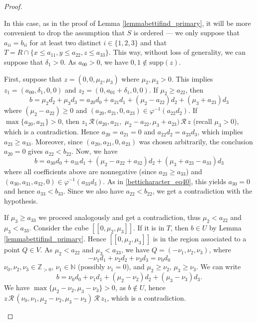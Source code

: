 \documentclass[12pt]{article}
\theoremstyle{remark}
\begin{document}
\begin{proof}
\begin{itemize}
    In this case, as in the proof of Lemma \ref{lemmabettifind_primary}, it will be more convenient to drop the assumption that $S$ is ordered --- we only suppose that $a_{ii}=b_{ii}$ for at least two distinct $i \in \{1,2,3\}$ and that  $T = R \cap \{x \leq a_{11},y\leq a_{22}, z \leq a_{33}\}$. This way, without loss of generality, we can suppose that $\delta_1 > 0$. As $a_{00} >0$, we have $0,1 \notin \text{supp}(z)$. 

    First, suppose that $z = (0,0,\mu_2,\mu_3)$ where $\mu_2,\mu_3>0$. This implies $z_1 = (a_{00},\delta_1,0,0 )$ and $z_2 =(0,a_{01}+\delta_1,0,0)$. 
    If $\mu_2 \geq a_{22}$, then
   \begin{equation}\label{betticharacter_eq40}
         b =\mu_2d_2 + \mu_3d_3 = a_{20}d_0 + a_{21}d_1 +(\mu_2-a_{22})d_2 + (\mu_3+a_{23})d_3
   \end{equation}
   where $(\mu_2-a_{22}) \geq 0$ and $(a_{20},a_{21},0,a_{23}) \in \varphi^{-1}(a_{22}d_2)$.
   If $\max \{a_{20},a_{21} \}>0$, then $z_1 \, \mathcal{R} \,(a_{20},a_{21},$ $ \mu_2-a_{22},\mu_3+a_{23}) \, \mathcal{R} \, z$ (recall $\mu_3>0$), which is a contradiction. Hence $a_{20}=a_{21}=0$ and $a_{22}d_2 = a_{23}d_3$, which implies $a_{23} \geq a_{33}$. Moreover, since $(a_{20},a_{21},0,a_{23})$ was chosen arbitrarily, the conclusion $a_{20}=0$ gives $a_{22} < b_{22}$. Now, we have
   \begin{equation}\label{betticharacter_eq401}
        b=  a_{30}d_0 + a_{31}d_1 + (\mu_2-a_{22} + a_{32})d_2 + (\mu_3+a_{23}-a_{33})d_3
   \end{equation}
   where all coefficients above are nonnegative (since $a_{23} \geq a_{33}$) and $(a_{30},a_{31},a_{32},0) \in \varphi^{-1}(a_{33}d_3)$. As in \eqref{betticharacter_eq40}, this yields $a_{30} = 0$ and hence $a_{33} < b_{33}$. Since we also have $a_{22} < b_{22}$, we get a contradiction with the hypothesis.
   
   If $\mu_3 \geq a_{33}$ we proceed analogously and get a contradiction, thus $\mu_2 < a_{22}$ and $ \mu_3 < a_{33}$. 
   Consider the cube $[[0,\mu_2,\mu_3]]$. If it is in $T$, then $b \in U$ by Lemma \ref{lemmabettifind_primary}. Hence $[[0,\mu_2,\mu_3]]$ is in the region associated to a point $Q \in V$.
   As $\mu_2 < a_{22}$ and $ \mu_3 < a_{33}$, we have $Q =(-\nu_1,\nu_2,\nu_3)$, where
    \begin{equation}\label{betticharacter_eq41}
        - \nu_1d_1 + \nu_2d_2 +  \nu_3d_3   =  \nu_0d_0
    \end{equation}
    $\nu_0,\nu_2,\nu_3 \in \mathbb{Z}_{>0}$, $\nu_1 \in \mathbb{N}$ (possibly $\nu_1=0$), and $\mu_2 \geq \nu_2$, $\mu_3 \geq \nu_3$.  We can write 
    \begin{equation}\label{betticharacter_eq42}
        b =  \nu_0d_0 + \nu_1d_1 + (\mu_2-\nu_2)d_2 + (\mu_3-\nu_3)d_3.
    \end{equation}
    We have $\max \{\mu_2-\nu_2,\mu_3-\nu_3 \}>0$, as $b \notin U$, hence $z \, \mathcal{R} \, (\nu_0,\nu_1,\mu_2-\nu_2,\mu_3-\nu_3) \, \mathcal{R}  \, z_1$, which is a contradiction. 
    


\end{itemize}
\end{proof}
\end{document}
